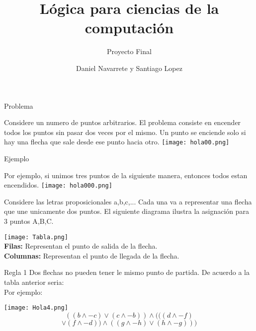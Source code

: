 \documentclass{beamer}
\title{Lógica para ciencias de la computación}
\subtitle{Proyecto Final}
\author{Daniel Navarrete y Santiago Lopez}
\begin{document}
\begin{frame}
  \titlepage 
\end{frame}


\begin{frame}{Problema}
\begin{multicols}{2}
\justify Considere un numero de puntos arbitrarios. El problema consiste en encender todos los puntos sin pasar dos veces por el mismo. Un punto se enciende solo si hay una flecha que sale desde ese punto hacia otro.
\center \texttt{[image: hola00.png]}
\end{multicols}
\end{frame}


\begin{frame}{Ejemplo}
\begin{multicols}{2}
\justify Por ejemplo, si unimos tres puntos de la siguiente manera, entonces todos estan  encendidos.
\center \texttt{[image: hola000.png]}
\end{multicols}
\end{frame}

\begin{frame}
\justify Considere las letras proposicionales a,b,c,... Cada una va a representar una flecha que une unicamente dos puntos.
El siguiente diagrama ilustra la asignación para 3 puntos A,B,C.
\begin{multicols}{2}
\center \texttt{[image: Tabla.png]}
\\[30 pt] \justify \textbf{Filas:} Representan el punto de salida de la flecha. 
\\[20 pt] \justify \textbf{Columnas:} Representan el punto de llegada de la flecha.
\end{multicols}
\end{frame}

\begin{frame}{Regla 1}
Dos flechas no pueden tener le mismo punto de partida. De acuerdo a la tabla anterior seria: \\[10 pt]
Por ejemplo: 
\begin{multicols}{2}
\center \texttt{[image: Hola4.png]}
\\[30 pt] \justify $$((b \wedge -c) \lor (c \wedge -b))\wedge(((d \wedge -f) $$ 
$$ \lor (f \wedge -d)) \wedge ((g \wedge -h) \lor (h \wedge -g))) $$
\end{multicols}
\end{frame}
\end{document}
